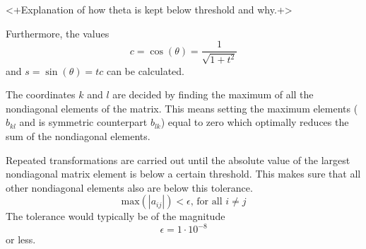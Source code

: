 <+Explanation of how theta is kept below threshold and why.+>

Furthermore, the values \[c = \cos{(\theta)} = \frac{1}{\sqrt{1 +
t^2}}\] and $s = \sin{(\theta)} = tc$ can be calculated. 

The coordinates $k$ and $l$ are decided by finding the maximum of
all the nondiagonal elements of the matrix. This means setting the
maximum elements ($b_{kl}$ and is symmetric counterpart $b_{lk}$)
equal to zero which optimally reduces the sum of the nondiagonal
elements.

Repeated transformations are carried out until the absolute value
of the largest nondiagonal matrix element is below a certain
threshold. This makes sure that all other nondiagonal elements also
are below this tolerance. \[\text{max}(|a_{ij}|) < \epsilon \text{,
for all } i \neq j\] The tolerance would typically be of the
magnitude \[\epsilon = 1 \cdot 10^{-8}\] or less.
